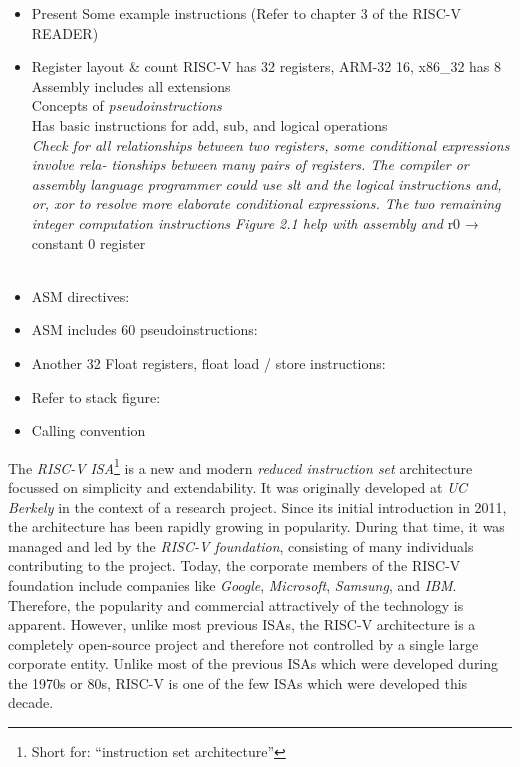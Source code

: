 
\begin{itemize}
    \item Present Some example instructions (Refer to chapter 3 of the RISC-V READER)
	\item Register layout \& count
        RISC-V has 32 registers, ARM-32 16, x86\_32 has 8\\
        Assembly includes all extensions\\
        Concepts of \emph{pseudoinstructions}~\cite[p.~10]{Patterson2017}\\
        Has basic instructions for add, sub, and logical operations\\
        \emph{Check for all relationships between two registers, some conditional expressions involve rela- tionships between many pairs of registers. The compiler or assembly language programmer could use slt and the logical instructions and, or, xor to resolve more elaborate conditional expressions. The two remaining integer computation instructions Figure 2.1 help with assembly and}
        r0 → constant 0 register\\
        ~\cite[p.~18]{Patterson2017}
    \item ASM directives: \cite[p.~39]{Patterson2017}
    \item ASM includes 60 pseudoinstructions: \cite[p.~42]{Patterson2017}
    \item Another 32 Float registers, float load / store instructions: \cite[pp.~48f.]{Patterson2017}
    \item Refer to stack figure: \cite[p.~40]{Patterson2017}
	\item Calling convention
\end{itemize}

\newpage

The \emph{RISC-V} \emph{ISA}\footnote{Short for: \enquote{instruction set architecture}} is a new and modern \emph{reduced instruction set} architecture focussed on simplicity and extendability.
It was originally developed at \emph{UC Berkely} in the context of a research project.
Since its initial introduction in 2011, the architecture has been rapidly growing in popularity.
During that time, it was managed and led by the \emph{RISC-V foundation}, consisting of many individuals contributing to the project.
Today, the corporate members of the RISC-V foundation include companies like \emph{Google}, \emph{Microsoft}, \emph{Samsung}, and \emph{IBM}.
Therefore, the popularity and commercial attractively of the technology is apparent.
However, unlike most previous ISAs, the RISC-V architecture is a completely open-source project and therefore not controlled by a single large corporate entity.
Unlike most of the previous ISAs which were developed during the 1970s or 80s, RISC-V is one of the few ISAs which were developed this decade.

